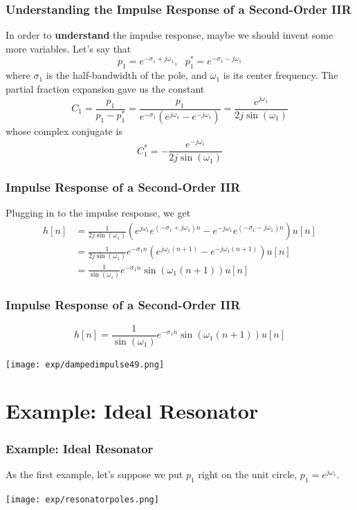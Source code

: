 \documentclass{beamer}
\begin{document}
\begin{frame}
  \frametitle{Understanding the Impulse Response of a Second-Order IIR}

  In order to {\bf understand} the impulse response, maybe we should
  invent some more variables.  Let's say that
  \[
  p_1 = e^{-\sigma_1+j\omega_1},~~~p_1^* = e^{-\sigma_1-j\omega_1}
  \]
  where $\sigma_1$ is the half-bandwidth of the pole, and $\omega_1$
  is its center frequency.  The partial fraction expansion gave us the constant
  \begin{displaymath}
    C_1 = \frac{p_1}{p_1-p_1^*}= \frac{p_1}{e^{-\sigma_1}\left(e^{j\omega_1}-e^{-j\omega_1}\right)}
    = \frac{e^{j\omega_1}}{2j\sin(\omega_1)}
  \end{displaymath}
  whose complex conjugate is
  \[
  C_1^* = -\frac{e^{-j\omega_1}}{2j\sin(\omega_1)}
  \]
\end{frame}

\begin{frame}
  \frametitle{Impulse Response of a Second-Order IIR}

  Plugging in to the impulse response, we get
  \begin{align*}
    h[n] &= \frac{1}{2j\sin(\omega_1)}
    \left(e^{j\omega_1}e^{(-\sigma_1+j\omega_1)n}-e^{-j\omega_1}e^{(-\sigma_1-j\omega_1)n}\right)u[n]\\
    &= \frac{1}{2j\sin(\omega_1)}e^{-\sigma_1n}\left(e^{j\omega_1(n+1)}-e^{-j\omega_1(n+1)}\right)u[n]\\
    &= \frac{1}{\sin(\omega_1)} e^{-\sigma_1n}\sin(\omega_1(n+1)) u[n]
  \end{align*}
\end{frame}

\begin{frame}
  \frametitle{Impulse Response of a Second-Order IIR}

  \[
  h[n] = \frac{1}{\sin(\omega_1)} e^{-\sigma_1n}\sin(\omega_1(n+1)) u[n]
  \]
  \centerline{\texttt{[image: exp/dampedimpulse49.png]}}
\end{frame}


\section[Resonator]{Example: Ideal Resonator}
\setcounter{subsection}{1}

\begin{frame}
  \frametitle{Example: Ideal Resonator}

  As the first example, let's suppose we put $p_1$ right on the unit
  circle, $p_1=e^{j\omega_1}$.

  \centerline{\texttt{[image: exp/resonatorpoles.png]}}
\end{frame}
\end{document}
